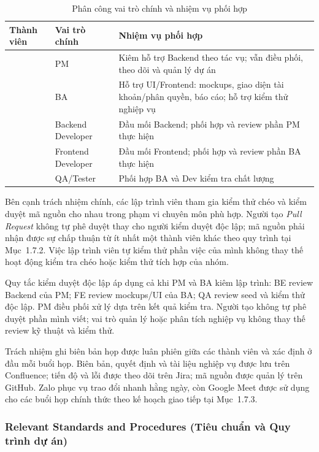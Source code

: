 \begin{table}[H]
\centering
\renewcommand{\arraystretch}{1.2}
\begin{tabularx}{\textwidth}{|>{\centering\arraybackslash}p{2.2cm}|p{4.1cm}|X|}
\hline
\textbf{Thành viên} & \textbf{Vai trò chính} & \textbf{Nhiệm vụ phối hợp} \\
\hline
1 & PM & Kiêm hỗ trợ Backend theo tác vụ; vẫn điều phối, theo dõi và quản lý dự án \\
\hline
2 & BA & Hỗ trợ UI/Frontend: mockups, giao diện tài khoản/phân quyền, báo cáo; hỗ trợ kiểm thử nghiệp vụ \\
\hline
3 & Backend Developer & Đầu mối Backend; phối hợp và review phần PM thực hiện \\
\hline
4 & Frontend Developer & Đầu mối Frontend; phối hợp và review phần BA thực hiện \\
\hline
5 & QA/Tester & Phối hợp BA và Dev kiểm tra chất lượng \\
\hline
\end{tabularx}
\caption{Phân công vai trò chính và nhiệm vụ phối hợp}
\label{tab:team-role-assignment}
\end{table}

Bên cạnh trách nhiệm chính, các lập trình viên tham gia kiểm thử chéo và kiểm duyệt mã nguồn cho nhau trong phạm vi chuyên môn phù hợp. Người tạo \textit{Pull Request} không tự phê duyệt thay cho người kiểm duyệt độc lập; mã nguồn phải nhận được sự chấp thuận từ ít nhất một thành viên khác theo quy trình tại Mục~1.7.2. Việc lập trình viên tự kiểm thử phần việc của mình không thay thế hoạt động kiểm tra chéo hoặc kiểm thử tích hợp của nhóm.

Quy tắc kiểm duyệt độc lập áp dụng cả khi PM và BA kiêm lập trình: BE review Backend của PM; FE review mockups/UI của BA; QA review seed và kiểm thử độc lập. PM điều phối xử lý dựa trên kết quả kiểm tra. Người tạo không tự phê duyệt phần mình viết; vai trò quản lý hoặc phân tích nghiệp vụ không thay thế review kỹ thuật và kiểm thử.

Trách nhiệm ghi biên bản họp được luân phiên giữa các thành viên và xác định ở đầu mỗi buổi họp. Biên bản, quyết định và tài liệu nghiệp vụ được lưu trên Confluence; tiến độ và lỗi được theo dõi trên Jira; mã nguồn được quản lý trên GitHub. Zalo phục vụ trao đổi nhanh hằng ngày, còn Google Meet được sử dụng cho các buổi họp chính thức theo kế hoạch giao tiếp tại Mục~1.7.3.

\subsubsection{Relevant Standards and Procedures (Tiêu chuẩn và Quy trình dự án)}

